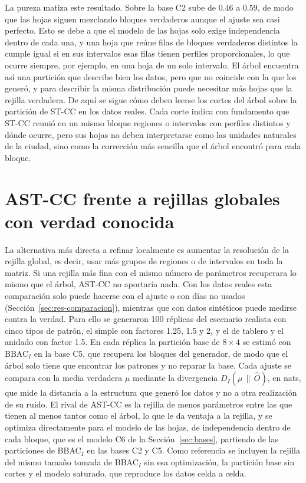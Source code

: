 La pureza matiza este resultado. Sobre la base C2 sube de 0.46 a 0.59, de modo que
las hojas siguen mezclando bloques verdaderos aunque el ajuste sea casi perfecto.
Esto se debe a que el modelo de las hojas solo exige independencia dentro de cada
una, y una hoja que reúne filas de bloques verdaderos distintos la cumple igual
si en sus intervalos esas filas tienen perfiles proporcionales, lo que ocurre
siempre, por ejemplo, en una hoja de un solo intervalo. El árbol encuentra así
una partición que describe bien los datos, pero que no coincide con la que los
generó, y para describir la misma distribución puede necesitar más hojas que la
rejilla verdadera. De aquí se sigue cómo deben leerse los cortes del árbol sobre
la partición de ST-CC en los datos reales. Cada corte indica con fundamento que
ST-CC reunió en un mismo bloque regiones o intervalos con perfiles distintos y
dónde ocurre, pero sus hojas no deben interpretarse como las unidades naturales de
la ciudad, sino como la corrección más sencilla que el árbol encontró para cada
bloque.

\section{AST-CC frente a rejillas globales con verdad conocida}\label{sec:res-rejillas-sinteticos}

La alternativa más directa a refinar localmente es aumentar la resolución de la
rejilla global, es decir, usar más grupos de regiones o de intervalos en toda la
matriz. Si una rejilla más fina con el mismo número de parámetros recuperara lo
mismo que el árbol, AST-CC no aportaría nada. Con los datos reales esta comparación
solo puede hacerse con el ajuste o con días no usados (Sección~\ref{sec:res-comparacion}),
mientras que con datos sintéticos puede medirse contra la verdad. Para ello se
generaron 100 réplicas del escenario realista con cinco tipos de patrón, el
simple con factores 1.25, 1.5 y 2, y el de tablero y el anidado con factor 1.5. En
cada réplica la partición base de $8 \times 4$ se estimó con BBAC$_I$ en la base
C5, que recupera los bloques del generador, de modo que el árbol solo tiene que
encontrar los patrones y no reparar la base. Cada ajuste se compara con la media
verdadera $\mu$ mediante la divergencia $D_I(\mu \,\|\, \hat O)$, en nats, que mide
la distancia a la estructura que generó los datos y no a otra realización de su
ruido. El rival de AST-CC es la rejilla de menos parámetros entre las que tienen al
menos tantos como el árbol, lo que le da ventaja a la rejilla, y se optimiza
directamente para el modelo de las hojas, de independencia dentro de cada bloque,
que es el modelo C6 de la Sección~\ref{sec:bases},
partiendo de las particiones de BBAC$_I$ en las bases C2 y C5. Como referencia se
incluyen la rejilla del mismo tamaño tomada de BBAC$_I$ sin esa optimización, la
partición base sin cortes y el modelo saturado, que reproduce los datos celda a
celda.

